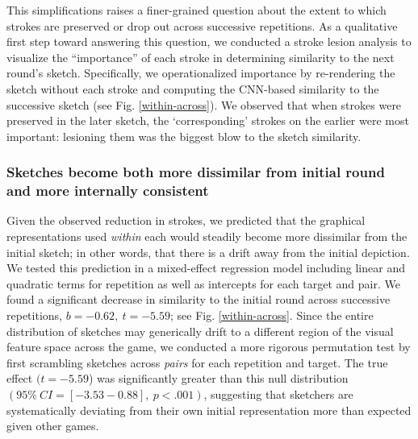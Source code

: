 \documentclass[10pt,letterpaper]{article}
\begin{document}
This simplifications raises a finer-grained question about the extent to which strokes are preserved or drop out across successive repetitions.
As a qualitative first step toward answering this question, we conducted a stroke lesion analysis to visualize the ``importance'' of each stroke in determining similarity to the next round's sketch.
Specifically, we operationalized importance by re-rendering the sketch without each stroke and computing the CNN-based similarity to the successive sketch (see Fig. \ref{within-across}).
We observed that when strokes were preserved in the later sketch, the `corresponding' strokes on the earlier were most important: lesioning them was the biggest blow to the sketch similarity.  %

\subsubsection{Sketches become both more dissimilar from initial round and more internally consistent}

Given the observed reduction in strokes, we predicted that the graphical representations used \emph{within} each would steadily become more dissimilar from the initial sketch; in other words, that there is a drift away from the initial depiction.
We tested this prediction in a mixed-effect regression model including linear and quadratic terms for repetition as well as intercepts for each target and pair. 
We found a significant decrease in similarity to the initial round across successive repetitions, $b = -0.62,~t = -5.59$; see Fig. \ref{within-across}.
Since the entire distribution of sketches may generically drift to a different region of the visual feature space across the game, we conducted a more rigorous permutation test by first scrambling sketches across \emph{pairs} for each repetition and target.
The true effect $(t = -5.59$) was significantly greater than this null distribution $(95\%~CI= [-3.53 -0.88], ~p < .001)$, suggesting that sketchers are systematically deviating from their own initial representation more than expected given other games. 
\end{document}
